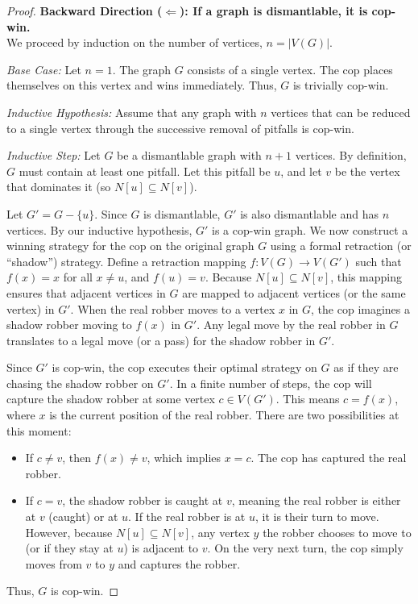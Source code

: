 \documentclass[12pt, a4paper]{article}
\begin{document}
\begin{proof}
    \vspace{0.3cm}
    \noindent\textbf{Backward Direction ($\Leftarrow$): If a graph is dismantlable, it is cop-win.} \\
    We proceed by induction on the number of vertices, $n = |V(G)|$.
    
    \textit{Base Case:} Let $n = 1$. The graph $G$ consists of a single vertex. The cop places themselves on this vertex and wins immediately. Thus, $G$ is trivially cop-win.
    
    \textit{Inductive Hypothesis:} Assume that any graph with $n$ vertices that can be reduced to a single vertex through the successive removal of pitfalls is cop-win.
    
    \textit{Inductive Step:} Let $G$ be a dismantlable graph with $n+1$ vertices. By definition, $G$ must contain at least one pitfall. Let this pitfall be $u$, and let $v$ be the vertex that dominates it (so $N[u] \subseteq N[v]$). 
    
    Let $G' = G - \{u\}$. Since $G$ is dismantlable, $G'$ is also dismantlable and has $n$ vertices. By our inductive hypothesis, $G'$ is a cop-win graph. We now construct a winning strategy for the cop on the original graph $G$ using a formal retraction (or ``shadow'') strategy. Define a retraction mapping $f: V(G) \to V(G')$ such that $f(x) = x$ for all $x \neq u$, and $f(u) = v$. Because $N[u] \subseteq N[v]$, this mapping ensures that adjacent vertices in $G$ are mapped to adjacent vertices (or the same vertex) in $G'$. When the real robber moves to a vertex $x$ in $G$, the cop imagines a shadow robber moving to $f(x)$ in $G'$. Any legal move by the real robber in $G$ translates to a legal move (or a pass) for the shadow robber in $G'$. 
    
    Since $G'$ is cop-win, the cop executes their optimal strategy on $G$ as if they are chasing the shadow robber on $G'$. In a finite number of steps, the cop will capture the shadow robber at some vertex $c \in V(G')$. This means $c = f(x)$, where $x$ is the current position of the real robber. There are two possibilities at this moment:
    \begin{itemize}
        \item If $c \neq v$, then $f(x) \neq v$, which implies $x = c$. The cop has captured the real robber.
        \item If $c = v$, the shadow robber is caught at $v$, meaning the real robber is either at $v$ (caught) or at $u$. If the real robber is at $u$, it is their turn to move. However, because $N[u] \subseteq N[v]$, any vertex $y$ the robber chooses to move to (or if they stay at $u$) is adjacent to $v$. On the very next turn, the cop simply moves from $v$ to $y$ and captures the robber.
    \end{itemize}
    Thus, $G$ is cop-win.


\end{proof}
\end{document}
